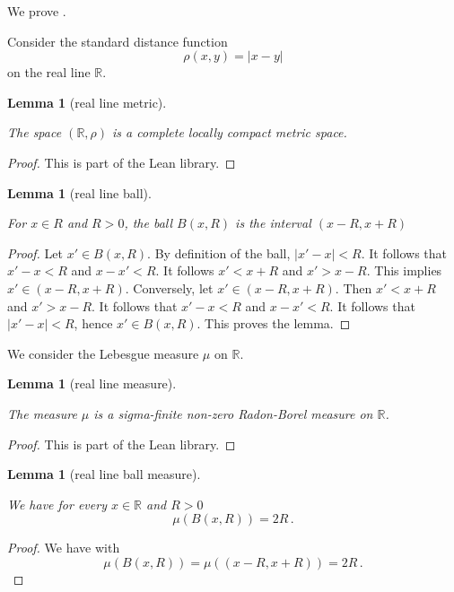 \documentclass[10pt,a4paper]{article}
\theoremstyle{plain}
\newtheorem{lemma}[theorem]{Lemma}
\theoremstyle{definition}
\numberwithin{equation}{subsection}
\newcommand{\R}{{\mathbb{R}}}
\newcommand{\lean}[1]{}
\newcommand{\uses}[1]{}
\newcommand{\leanok}{}
\begin{document}
We prove .

Consider the standard distance function
\begin{equation}
    \rho(x,y)=|x-y|
\end{equation}
on the real line $\R$.
\begin{lemma}[real line metric]
\label{real-line-metric}
\leanok
\lean{instProperSpaceReal, locallyCompact_of_proper, Real.instCompleteSpace}
The space $(\R,\rho)$ is a complete locally compact metric space.
\end{lemma}
\begin{proof}
    \leanok
    This is part of the Lean library.
\end{proof}
\begin{lemma}[real line ball]
\label{real-line-ball}
    \leanok
    \lean{Real.ball_eq_Ioo}
    For $x\in R$ and $R>0$, the ball $B(x,R)$ is the interval $(x-R,x+R)$
\end{lemma}
\begin{proof}
\leanok
Let $x'\in B(x,R)$. By definition of the ball,
$|x'-x|<R$. It follows that $x'-x<R$ and $x-x'<R$.
It follows $x'<x+R$ and $x'>x-R$. This implies
$x'\in (x-R,x+R)$.
Conversely, let $x'\in (x-R,x+R)$. Then
$x'<x+R$ and $x'>x-R$. It follows that
$x'-x<R$ and $x-x'<R$. It follows that $|x'-x|<R$,
hence $x'\in B(x,R)$.
This proves the lemma.
\end{proof}
We consider the Lebesgue measure $\mu$ on $\R$.
\begin{lemma}[real line measure]
\label{real-line-measure}
\leanok
\lean{instIsAddHaarMeasureVolume}
    The measure $\mu$ is a sigma-finite non-zero
    Radon-Borel measure on $\R$.
\end{lemma}
\begin{proof}
    \leanok
    This is part of the Lean library.
\end{proof}
\begin{lemma}[real line ball measure]
\label{real-line-ball-measure}
\uses{real-line-ball}
    \leanok
    \lean{Real.volume_ball}
    We have for every $x\in \R$ and $R>0$
    \begin{equation}
        \mu(B(x,R))=2R\, .
    \end{equation}
\end{lemma}
\begin{proof}
\leanok
We have with 
\begin{equation}
    \mu(B(x,R))=\mu((x-R,x+R))=2R\, .
\end{equation}
\end{proof}
\end{document}
